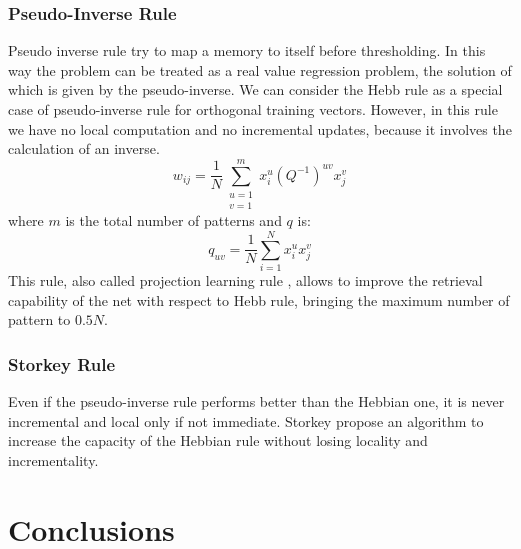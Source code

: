 \documentclass[letterpaper,twocolumn,10pt]{article}
\begin{document}
\subsubsection{Pseudo-Inverse Rule}
Pseudo inverse rule try to map a memory to itself before thresholding. In this way the problem can be treated as a real value regression problem, the solution of which is given by the pseudo-inverse. We can consider the Hebb rule as a special case of pseudo-inverse rule for orthogonal training vectors. However, in this rule we have no local computation and no incremental updates, because it involves the calculation of an inverse.
\begin{displaymath}
	w_{ij} = \frac{1}{N} \sum_{\substack{u=1\\v=1    }}^m x_i^u (Q^{-1})^{uv} x_j^v
\end{displaymath}
where $m$ is the total number of patterns and $q$ is:
\begin{displaymath}
	q_{uv} = \frac{1}{N} \sum_{i=1}^N x_i^u x_j^v
\end{displaymath}
This rule, also called projection learning rule \cite{personnazcoll}, allows to improve the retrieval capability of the net with respect to Hebb rule, bringing the maximum number of pattern to $0.5N$.

\subsubsection{Storkey Rule \cite{Storkey97increasingthe}}
Even if the pseudo-inverse rule performs better than the Hebbian one, it is never incremental and local only if not immediate. Storkey propose an algorithm to increase the capacity of the Hebbian rule without losing locality and incrementality.



\section{Conclusions}

\cite{pelillo} 

\end{document}
